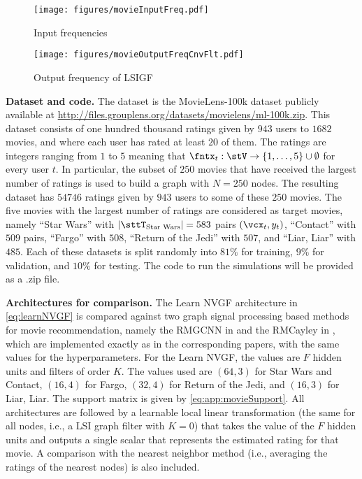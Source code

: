 \begin{figure}
    \centering
    \texttt{[image: figures/movieInputFreq.pdf]}
    \caption{Input frequencies}
    \label{fig:app:starWars:inputFreq}
\end{figure}
\begin{figure}
    \centering
    \texttt{[image: figures/movieOutputFreqCnvFlt.pdf]}
    \caption{Output frequency of LSIGF}
    \label{fig:app:starWars:outputFreqLSIGF}
\end{figure}

\textbf{Dataset and code.} The dataset is the MovieLens-100k dataset \cite{Harper2016-MovieLens} publicly available at \url{http://files.grouplens.org/datasets/movielens/ml-100k.zip}. This dataset consists of one hundred thousand ratings given by $943$ users to $1682$ movies, and where each user has rated at least $20$ of them. The ratings are integers ranging from $1$ to $5$ meaning that $\fntx_{t} : \stV \to \{1,\ldots,5\} \cup \emptyset$ for every user $t$. In particular, the subset of $250$ movies that have received the largest number of ratings is used to build a graph with $N=250$ nodes. The resulting dataset has $54746$ ratings given by $943$ users to some of these $250$ movies. The five movies with the largest number of ratings are considered as target movies, namely ``Star Wars'' with $|\sttT_{\text{Star Wars}}| = 583$ pairs $(\vcx_{t},y_{t})$, ``Contact'' with $509$ pairs, ``Fargo'' with $508$, ``Return of the Jedi'' with $507$, and ``Liar, Liar'' with $485$. Each of these datasets is split randomly into $81\%$ for training, $9\%$ for validation, and $10\%$ for testing. The code to run the simulations will be provided as a .zip file.

\textbf{Architectures for comparison.} The Learn NVGF architecture in \eqref{eq:learnNVGF} is compared against two graph signal processing based methods for movie recommendation, namely the RMGCNN in \cite{Monti2017-RecommendationGNN} and the RMCayley in \cite{Levie2018-CayleyNets}, which are implemented exactly as in the corresponding papers, with the same values for the hyperparameters. For the Learn NVGF, the values are $F$ hidden units and filters of order $K$. The values used are $(64,3)$ for Star Wars and Contact, $(16,4)$ for Fargo, $(32,4)$ for Return of the Jedi, and $(16,3)$ for Liar, Liar. The support matrix is given by \eqref{eq:app:movieSupport}. All architectures are followed by a learnable local linear transformation (the same for all nodes, i.e., a LSI graph filter with $K=0$) that takes the value of the $F$ hidden units and outputs a single scalar that represents the estimated rating for that movie. A comparison with the nearest neighbor method (i.e., averaging the ratings of the nearest nodes) is also included.


